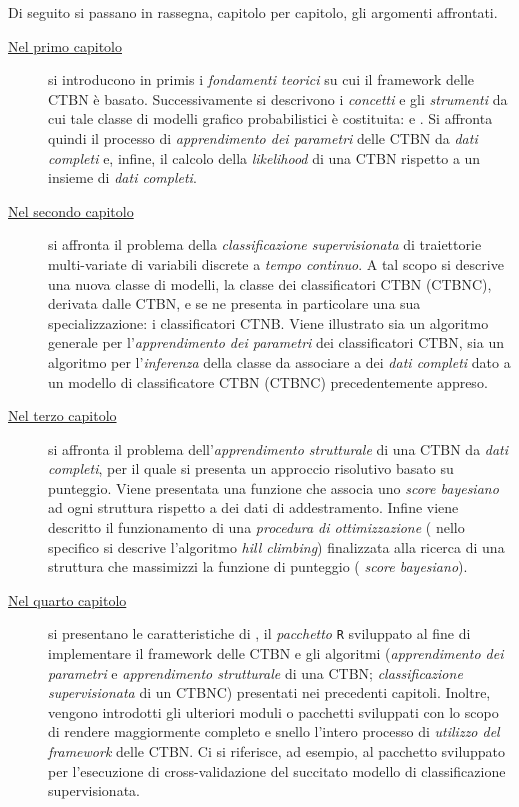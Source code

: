 Di seguito si passano in rassegna, capitolo per capitolo, gli argomenti affrontati.
\begin{description}
	\item[{\hyperref[cap:ctbn]{Nel primo capitolo}}]
	si introducono in primis i \emph{fondamenti teorici} su cui il framework delle \acf{CTBN} è basato. Successivamente si descrivono i \emph{concetti} e gli \emph{strumenti} da cui tale classe di modelli grafico probabilistici è costituita: \emph{\stats{}} e \emph{\cim{}}. Si affronta quindi il processo di \emph{apprendimento dei parametri} delle \acs{CTBN} da \emph{dati completi} e, infine, il calcolo della \emph{likelihood} di una \acs{CTBN} rispetto a un insieme di \emph{dati completi}.
	\item[{\hyperref[cap:ctbnc]{Nel secondo capitolo}}]
	si affronta il problema della \emph{classificazione supervisionata} di traiettorie multi-variate di variabili discrete a \emph{tempo continuo}. A tal scopo si descrive una nuova classe di modelli, la classe dei classificatori \acl{CTBN} (\acs{CTBNC}), derivata dalle \acs{CTBN}, e se ne presenta in particolare una sua specializzazione: i classificatori \acs{CTNB}. Viene illustrato sia un algoritmo generale per l'\emph{apprendimento dei parametri} dei classificatori \acs{CTBN}, sia un algoritmo per l'\emph{inferenza} della classe da associare a dei \emph{dati completi} dato a un modello di classificatore \acs{CTBN} (\acs{CTBNC}) precedentemente appreso.
	\item[{\hyperref[cap:structurallearning]{Nel terzo capitolo}}]
	si affronta il problema dell'\emph{apprendimento strutturale} di una \acs{CTBN} da \emph{dati completi}, per il quale si presenta un approccio risolutivo basato su punteggio. Viene presentata una funzione che associa uno \emph{score bayesiano} ad ogni struttura rispetto a dei dati di addestramento. Infine viene descritto il funzionamento di una \emph{procedura di ottimizzazione} (\ie{} nello specifico si descrive l'algoritmo \emph{hill climbing}) finalizzata alla ricerca di una struttura che massimizzi la funzione di punteggio (\ie{} \emph{score bayesiano}).
	\item[{\hyperref[cap:ctbnr]{Nel quarto capitolo}}]
	si presentano le caratteristiche di \rctbn{}, il \emph{pacchetto} \lstinline[]|R| sviluppato al fine di implementare il framework delle \acs{CTBN} e gli algoritmi (\emph{apprendimento dei parametri} e \emph{apprendimento strutturale} di una \acs{CTBN}; \emph{classificazione supervisionata} di un \acs{CTBNC}) presentati nei precedenti capitoli. Inoltre, vengono introdotti gli ulteriori moduli o pacchetti sviluppati con lo scopo di rendere maggiormente completo e snello l'intero processo di \emph{utilizzo del framework} delle \acs{CTBN}. Ci si riferisce, ad esempio, al pacchetto sviluppato per l'esecuzione di cross-validazione del succitato modello di classificazione supervisionata.

\end{description}
